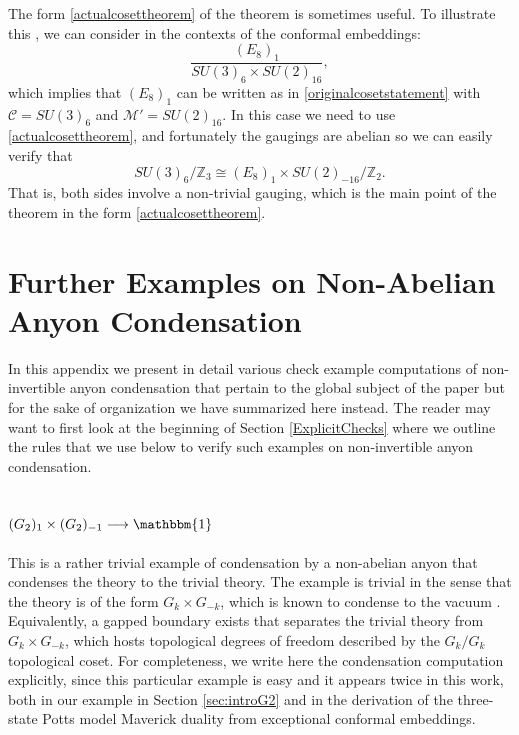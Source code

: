 \documentclass[11pt]{article}
\numberwithin{equation}{section}
\begin{document}
The form \eqref{actualcosettheorem} of the theorem is sometimes useful. To illustrate this \cite{Frohlich:2003hm}, we can consider in the contexts of the conformal embeddings:
\begin{equation}
    \frac{(E_{8})_{1}}{SU(3)_{6} \times SU(2)_{16}},
\end{equation}
which implies that $(E_{8})_{1}$ can be written as in \eqref{originalcosetstatement} with $\mathcal{C} = SU(3)_{6}$ and $\mathcal{M}' = SU(2)_{16}$. In this case we need to use \eqref{actualcosettheorem}, and fortunately the gaugings are abelian so we can easily verify that
\begin{equation}
    SU(3)_{6}/\mathbb{Z}_{3} \cong (E_{8})_{1} \times SU(2)_{-16}/\mathbb{Z}_{2}.
\end{equation}
That is, both sides involve a non-trivial gauging, which is the main point of the theorem in the form \eqref{actualcosettheorem}. 





\section{Further Examples on Non-Abelian Anyon Condensation}

In this appendix we present in detail various check example computations of non-invertible anyon condensation that pertain to the global subject of the paper but for the sake of organization we have summarized here instead. The reader may want to first look at the beginning of Section \ref{ExplicitChecks} where we outline the rules that we use below to verify such examples on non-invertible anyon condensation.






\subsection{$(G_{2})_{1} \times (G_{2})_{-1} \longrightarrow \mathbbm{1}$} \label{G21DrinfeldToVacuum}



This is a rather trivial example of condensation by a non-abelian anyon that condenses the theory to the trivial theory. The example is trivial in the sense that the theory is of the form $G_{k} \times G_{-k}$, which is known to condense to the vacuum \cite{muger2001subfactors,Davydov:2011pp,davydov2013witt}. Equivalently, a gapped boundary exists that separates the trivial theory from $G_{k} \times G_{-k}$, which hosts topological degrees of freedom described by the $G_{k}/G_{k}$ topological coset. For completeness, we write here the condensation computation explicitly, since this particular example is easy and it appears twice in this work, both in our example in Section \ref{sec:introG2} and in the derivation of the three-state Potts model Maverick duality from exceptional conformal embeddings.
\end{document}
